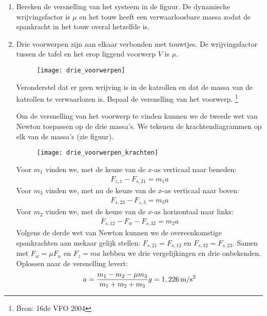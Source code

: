 \begin{enumerate}
\item Bereken de versnelling van het systeem in de figuur. De dynamische wrijvingsfactor is $\mu$ en het touw heeft een verwaarloosbare massa zodat de spankracht in het touw overal hetzelfde is. 


\item Drie voorwerpen zijn aan elkaar verbonden met touwtjes. De wrij\-vings\-factor tussen de tafel en het erop liggend voorwerp $V$ is $\mu$.
\begin{figure}[h]
\begin{center}
\texttt{[image: drie\_voorwerpen]}
\end{center}
\end{figure}
Veronderstel dat er geen wrijving is in de katrollen en dat de massa van de katrollen te verwaarlozen is. Bepaal de versnelling van het voorwerp. \footnote{Bron: 16de VFO 2004}
\begin{oplossing}
\newline
Om de versnelling van het voorwerp te vinden kunnen we de tweede wet van Newton toepassen op de drie massa's. We tekenen de krachtendiagrammen op elk van de massa's (zie figuur). 
\begin{figure}[h]
\begin{center}
\texttt{[image: drie\_voorwerpen\_krachten]}
\end{center}
\end{figure}
\newline
Voor $m_1$ vinden we, met de keuze van de $x$-as verticaal naar beneden:
\begin{eqnarray}
F_{z,1}-F_{s,21}=m_1a\label{m_1}
\end{eqnarray}
Voor $m_3$ vinden we, met nu de keuze van de $x$-as verticaal naar boven:
\begin{eqnarray}
F_{s,23}-F_{z,3}=m_3a\label{m_3}
\end{eqnarray}
Voor $m_2$ vinden we, met de keuze van de $x$-as horizontaal naar links:
\begin{eqnarray}
F_{s,12}-F_w-F_{s,32}=m_2a\label{m_2}
\end{eqnarray}
Volgens de derde wet van Newton kunnen we de overeenkomstige spankrachten aan mekaar gelijk stellen: $F_{s,21}=F_{s,12}$ en $F_{s,32}=F_{s,23}$. Samen met $F_w=\mu F_n$ en $F_z=ma$ hebben we drie vergelijkingen en drie onbekenden. Oplossen naar de versnelling levert:
\begin{eqnarray*}
a=\frac{m_1-m_2-\mu m_3}{m_1+m_2+m_3}g=1,226\rm\,m/s^2

\end{eqnarray*}
\end{oplossing}
\end{enumerate}
